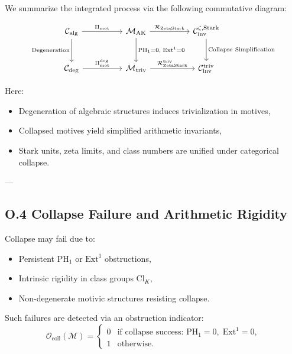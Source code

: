 \documentclass[11pt]{article}
\begin{document}
We summarize the integrated process via the following commutative diagram:

\[
\begin{tikzcd}[column sep=huge, row sep=large]
\mathcal{C}_{\mathrm{alg}} \arrow[r, "{\Pi_{\mathrm{mot}}}"] \arrow[d, "{\mathrm{Degeneration}}"']
& \mathcal{M}_{\mathrm{AK}} \arrow[r, "{\mathcal{R}_{\mathrm{ZetaStark}}}"] \arrow[d, "{\mathrm{PH}_1 = 0,\; \mathrm{Ext}^1 = 0}"]
& \mathcal{C}_{\mathrm{inv}}^{\zeta,\mathrm{Stark}} \arrow[d, "{\mathrm{Collapse\ Simplification}}"] \\
\mathcal{C}_{\mathrm{deg}} \arrow[r, "{\Pi_{\mathrm{mot}}^{\mathrm{deg}}}"]
& \mathcal{M}_{\mathrm{triv}} \arrow[r, "{\mathcal{R}_{\mathrm{ZetaStark}}^{\mathrm{triv}}}"]
& \mathcal{C}_{\mathrm{inv}}^{\mathrm{triv}}
\end{tikzcd}
\]


Here:
\begin{itemize}
  \item Degeneration of algebraic structures induces trivialization in motives,
  \item Collapsed motives yield simplified arithmetic invariants,
  \item Stark units, zeta limits, and class numbers are unified under categorical collapse.
\end{itemize}

---

\subsection*{O.4 Collapse Failure and Arithmetic Rigidity}

Collapse may fail due to:
\begin{itemize}
  \item Persistent \( \mathrm{PH}_1 \) or \( \mathrm{Ext}^1 \) obstructions,
  \item Intrinsic rigidity in class groups \( \mathrm{Cl}_K \),
  \item Non-degenerate motivic structures resisting collapse.
\end{itemize}

Such failures are detected via an obstruction indicator:
\[
\mathcal{O}_{\mathrm{coll}}(\mathcal{M}) =
\begin{cases}
0 & \text{if collapse success: } \mathrm{PH}_1 = 0,\; \mathrm{Ext}^1 = 0, \\
1 & \text{otherwise.}
\end{cases}
\]
\end{document}

